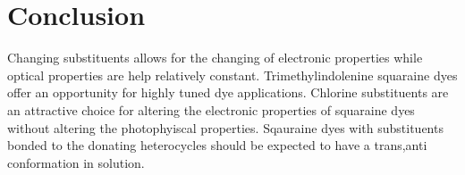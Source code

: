 \documentclass[journal=jacsat,manuscript=article]{achemso}
\begin{document}
\section{Conclusion}
Changing substituents allows for the changing of electronic properties while optical properties are help relatively constant. Trimethylindolenine squaraine dyes offer an opportunity for highly tuned dye applications. Chlorine substituents are an attractive choice for altering the electronic properties of squaraine dyes without altering the photophyiscal properties. Sqauraine dyes with substituents bonded to the donating heterocycles should be expected to have a trans,anti conformation in solution. 

\newpage
 

\end{document}
